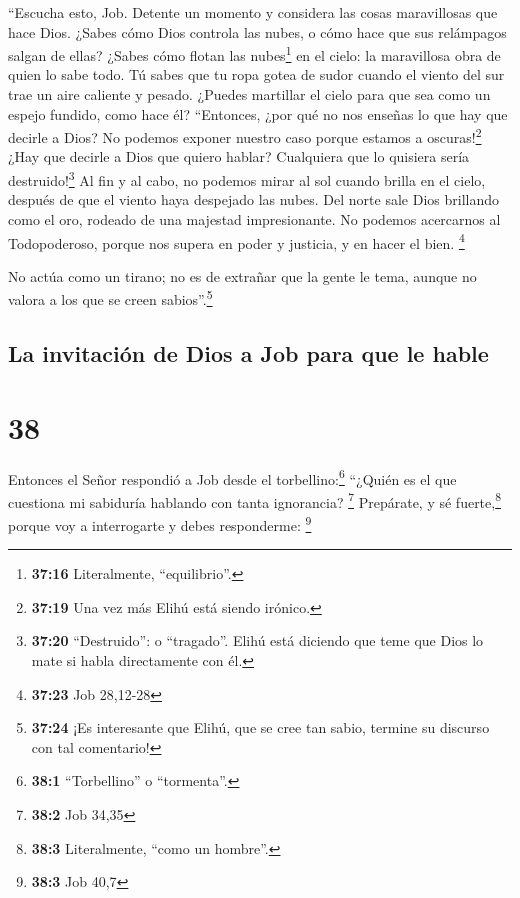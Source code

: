  ``Escucha esto, Job. Detente un momento y considera las
cosas maravillosas que hace Dios.  ¿Sabes cómo Dios
controla las nubes, o cómo hace que sus relámpagos salgan de ellas?
 ¿Sabes cómo flotan las nubes\footnote{\textbf{37:16}
  Literalmente, ``equilibrio''.} en el cielo: la maravillosa obra de
quien lo sabe todo.  Tú sabes que tu ropa gotea de sudor
cuando el viento del sur trae un aire caliente y pesado. 
¿Puedes martillar el cielo para que sea como un espejo fundido, como
hace él?  ``Entonces, ¿por qué no nos enseñas lo que hay
que decirle a Dios? No podemos exponer nuestro caso porque estamos a
oscuras!\footnote{\textbf{37:19} Una vez más Elihú está siendo irónico.}
 ¿Hay que decirle a Dios que quiero hablar? Cualquiera
que lo quisiera sería destruido!\footnote{\textbf{37:20} ``Destruido'':
  o ``tragado''. Elihú está diciendo que teme que Dios lo mate si habla
  directamente con él.}  Al fin y al cabo, no podemos
mirar al sol cuando brilla en el cielo, después de que el viento haya
despejado las nubes.  Del norte sale Dios brillando como
el oro, rodeado de una majestad impresionante.  No
podemos acercarnos al Todopoderoso, porque nos supera en poder y
justicia, y en hacer el bien. \footnote{\textbf{37:23} Job 28,12-28}

 No actúa como un tirano; no es de extrañar que la gente
le tema, aunque no valora a los que se creen sabios''.\footnote{\textbf{37:24}
  ¡Es interesante que Elihú, que se cree tan sabio, termine su discurso
  con tal comentario!}

\hypertarget{la-invitaciuxf3n-de-dios-a-job-para-que-le-hable}{%
\subsection{La invitación de Dios a Job para que le
hable}\label{la-invitaciuxf3n-de-dios-a-job-para-que-le-hable}}

\hypertarget{section-37}{%
\section{38}\label{section-37}}

 Entonces el Señor respondió a Job desde el
torbellino:\footnote{\textbf{38:1} ``Torbellino'' o ``tormenta''.}
 ``¿Quién es el que cuestiona mi sabiduría hablando con
tanta ignorancia? \footnote{\textbf{38:2} Job 34,35} 
Prepárate, y sé fuerte,\footnote{\textbf{38:3} Literalmente, ``como un
  hombre''.} porque voy a interrogarte y debes responderme: \footnote{\textbf{38:3}
  Job 40,7}

